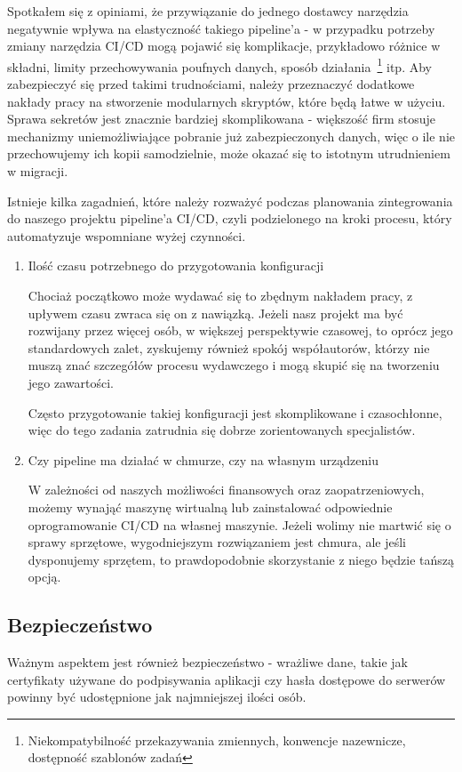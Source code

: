 Spotkałem się z opiniami, że przywiązanie do jednego dostawcy narzędzia negatywnie wpływa na elastyczność 
takiego pipeline'a - w przypadku potrzeby zmiany narzędzia CI/CD mogą pojawić się komplikacje, 
przykładowo różnice w składni, limity przechowywania poufnych danych, sposób działania~\footnote[2]{
    Niekompatybilność przekazywania zmiennych, konwencje nazewnicze, dostępność szablonów zadań
} itp.
Aby zabezpieczyć się przed takimi trudnościami, należy przeznaczyć dodatkowe nakłady pracy na stworzenie 
modularnych skryptów, które będą łatwe w użyciu.
Sprawa sekretów jest znacznie bardziej skomplikowana - większość firm stosuje mechanizmy uniemożliwiające pobranie już 
zabezpieczonych danych, więc o ile nie przechowujemy ich kopii samodzielnie, może okazać się to istotnym utrudnieniem w migracji.

Istnieje kilka zagadnień, które należy rozważyć podczas planowania zintegrowania do naszego projektu pipeline'a CI/CD,
czyli podzielonego na kroki procesu, który automatyzuje wspomniane wyżej czynności.
\begin{enumerate}
    \item Ilość czasu potrzebnego do przygotowania konfiguracji

    Chociaż początkowo może wydawać się to zbędnym nakładem pracy, z upływem czasu zwraca się on z nawiązką.
    Jeżeli nasz projekt ma być rozwijany przez więcej osób, w większej perspektywie czasowej, 
    to oprócz jego standardowych zalet, zyskujemy również spokój współautorów, 
    którzy nie muszą znać szczegółów procesu wydawczego i mogą skupić się na tworzeniu jego zawartości.

    Często przygotowanie takiej konfiguracji jest skomplikowane i czasochłonne, 
    więc do tego zadania zatrudnia się dobrze zorientowanych specjalistów.

    \item Czy pipeline ma działać w chmurze, czy na własnym urządzeniu

    W zależności od naszych możliwości finansowych oraz zaopatrzeniowych, możemy wynająć maszynę wirtualną
    lub zainstalować odpowiednie oprogramowanie CI/CD na własnej maszynie. 
    Jeżeli wolimy nie martwić się o sprawy sprzętowe, wygodniejszym rozwiązaniem jest chmura,
    ale jeśli dysponujemy sprzętem, to prawdopodobnie skorzystanie z niego będzie tańszą opcją. 
\end{enumerate}


\subsection{Bezpieczeństwo}
Ważnym aspektem jest również bezpieczeństwo - wrażliwe dane, takie jak certyfikaty używane do podpisywania aplikacji czy
hasła dostępowe do serwerów powinny być udostępnione jak najmniejszej ilości osób.

